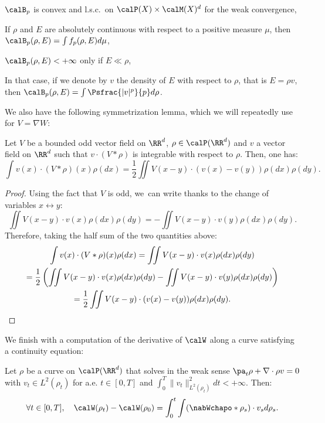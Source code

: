 \skpt
\begin{lemma}\label{lemma:BenamouBrenier}
\begin{enumeratei}
\item $\calB_p$ is convex and l.s.c.\ on $\calP(X) \times \calM(X)^d$ for the weak convergence,
\item If $\rho$ and $E$ are absolutely continuous with respect to a positive measure $\mu$, then $\calB_p(\rho, E) = \int f_p(\rho, E) d\mu$,
\item $\calB_p(\rho, E) < +\infty$ only if $E \ll \rho$,
\item In that case, if we denote by $v$ the density of $E$ with respect to $\rho$, that is $E = \rho v$, then $\calB_p(\rho, E) = \int \Psfrac{|v|^p}{p} d\rho$.
\end{enumeratei}
\end{lemma}
We also have the following symmetrization lemma, which we will repeatedly use for $V = \nabla W$:
\begin{lemma}\label{lemma:symmetrization}
Let $V$ be a bounded odd vector field on $\RR^d$, $\rho \in \calP(\RR^d)$ and $v$ a vector field on $\RR^d$ such that $v \cdot (V * \rho)$ is integrable with respect to $\rho$. Then, one has:
\[
\int v(x) \cdot (V * \rho)(x) \rho(dx) = \frac{1}{2} \iint V(x-y) \cdot (v(x)-v(y)) \rho(dx) \rho(dy).
\]
\end{lemma}
\begin{proof}
Using the fact that $V$ is odd, we~can write thanks to the change of variables $x \leftrightarrow y$:
\[
\iint V(x-y) \cdot v(x) \rho(dx) \rho(dy) = - \iint V(x-y) \cdot v(y) \rho(dx) \rho(dy).
\]
Therefore, taking the half sum of the two quantities above:
\begin{multline*}
\int v(x) \cdot (V * \rho)(x) \rho(dx) = \iint V(x-y) \cdot v(x) \rho(dx) \rho(dy) \\
= \frac 12 \left(\iint V(x-y) \cdot v(x) \rho(dx) \rho(dy)
- \iint V(x-y) \cdot v(y) \rho(dx) \rho(dy) \right) \\
= \frac{1}{2} \iint V(x-y) \cdot (v(x)-v(y)) \rho(dx) \rho(dy).\qedhere
\end{multline*}
\end{proof}
We finish with a computation of the derivative of $\calW$ along a curve satisfying a continuity equation:
\begin{lemma}\label{lemma:derEnergieInteraction}
Let $\rho$ be a curve on $\calP(\RR^d)$ that solves in the weak sense $\pa_t \rho + \nabla \cdot \rho v = 0$ with $v_t \in L^2(\rho_t)$ for a.e. $t \in [0,T]$ and $\int_0^T \|v_t\|_{L^2(\rho_t)}^2 dt < +\infty$. Then:
\begin{equation*}\label{eq:derEnergieInteraction}
\forall t \in [0,T], \quad \calW(\rho_t) - \calW(\rho_0) = \int_0^t \int (\nabWchapo * \rho_s) \cdot v_s d\rho_s.
\end{equation*}
\end{lemma}
